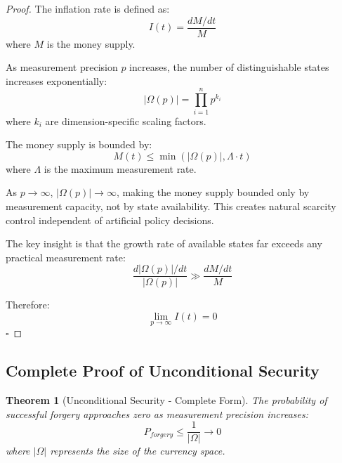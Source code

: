 \documentclass[12pt,a4paper]{article}
\newtheorem{theorem}{Theorem}
\begin{document}
\begin{proof}
The inflation rate is defined as:
\begin{equation}
I(t) = \frac{dM/dt}{M}
\end{equation}
where $M$ is the money supply.

As measurement precision $p$ increases, the number of distinguishable states increases exponentially:
\begin{equation}
|\Omega(p)| = \prod_{i=1}^{n} p^{k_i}
\end{equation}
where $k_i$ are dimension-specific scaling factors.

The money supply is bounded by:
\begin{equation}
M(t) \leq \min(|\Omega(p)|, \Lambda \cdot t)
\end{equation}
where $\Lambda$ is the maximum measurement rate.

As $p \to \infty$, $|\Omega(p)| \to \infty$, making the money supply bounded only by measurement capacity, not by state availability. This creates natural scarcity control independent of artificial policy decisions.

The key insight is that the growth rate of available states far exceeds any practical measurement rate:
\begin{equation}
\frac{d|\Omega(p)|/dt}{|\Omega(p)|} \gg \frac{dM/dt}{M}
\end{equation}

Therefore:
\begin{equation}
\lim_{p \to \infty} I(t) = 0
\end{equation}
$\square$
\end{proof}

\subsection{Complete Proof of Unconditional Security}

\begin{theorem}[Unconditional Security - Complete Form]
The probability of successful forgery approaches zero as measurement precision increases:
\begin{equation}
P_{forgery} \leq \frac{1}{|\Omega|} \rightarrow 0
\end{equation}
where $|\Omega|$ represents the size of the currency space.
\end{theorem}
\end{document}

